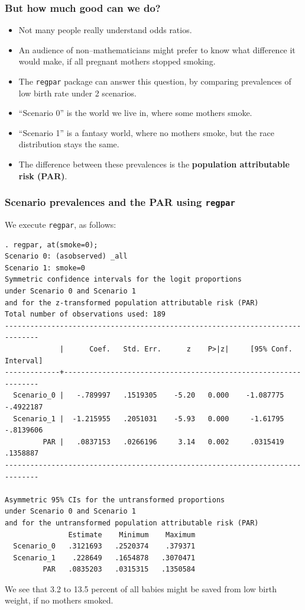 \documentclass[11pt]{beamer}
\begin{document}
\begin{frame}
\frametitle{But how much good can we do?}

\begin{itemize}

\item<2-> Not many people really understand odds ratios.

\item<3-> An audience of non--mathematicians might prefer to know what difference it would make,
if all pregnant mothers stopped smoking.

\item<4-> The \texttt{regpar} package can answer this question,
by comparing prevalences of low birth rate under 2 scenarios.

\item<5-> ``Scenario 0'' is the world we live in, where some mothers smoke.

\item<6-> ``Scenario 1'' is a fantasy world, where no mothers smoke,
but the race distribution stays the same.

\item<7-> The difference between these prevalences is the \textbf{population attributable risk (PAR)}.

\end{itemize}

\end{frame}

\begin{frame}[fragile]
\frametitle{Scenario prevalences and the PAR using \texttt{regpar}}

We execute \texttt{regpar}, as follows:

\tiny
\begin{verbatim}
. regpar, at(smoke=0);
Scenario 0: (asobserved) _all
Scenario 1: smoke=0
Symmetric confidence intervals for the logit proportions
under Scenario 0 and Scenario 1
and for the z-transformed population attributable risk (PAR)
Total number of observations used: 189
------------------------------------------------------------------------------
             |      Coef.   Std. Err.      z    P>|z|     [95% Conf. Interval]
-------------+----------------------------------------------------------------
  Scenario_0 |   -.789997   .1519305    -5.20   0.000    -1.087775   -.4922187
  Scenario_1 |  -1.215955   .2051031    -5.93   0.000     -1.61795   -.8139606
         PAR |   .0837153   .0266196     3.14   0.002     .0315419    .1358887
------------------------------------------------------------------------------

Asymmetric 95% CIs for the untransformed proportions
under Scenario 0 and Scenario 1
and for the untransformed population attributable risk (PAR)
               Estimate    Minimum    Maximum 
  Scenario_0   .3121693   .2520374    .379371 
  Scenario_1    .228649   .1654878   .3070471 
         PAR   .0835203   .0315315   .1350584 
\end{verbatim}
\normalsize

We see that 3.2 to 13.5 percent of all babies might be saved from low birth weight,
if no mothers smoked.

\end{frame}
\end{document}
